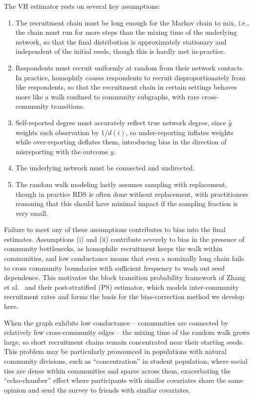 \documentclass[11pt,a4paper,twocolumn,twoside]{rho-class/rho}
\begin{document}
The VH estimator rests on several key assumptions: 
\begin{enumerate}[label=\roman*)]
    \item The recruitment chain must be long enough for the Markov chain to mix, i.e., the chain must run for more steps than the mixing time of the underlying network, so that the final distribution is approximately stationary and independent of the initial seeds, though this is hardly met in-practice.
    \item Respondents must recruit uniformly at random from their network contacts. In practice, homophily causes respondents to recruit disproportionately from like respondents, so that the recruitment chain in certain settings behaves more like a walk confined to community subgraphs, with rare cross-community transitions.
    \item Self-reported degree must accurately reflect true network degree, since $\hat{y}$ weights each observation by $1/d(i)$, so under-reporting inflates weights while over-reporting deflates them, introducing bias in the direction of misreporting with the outcome $y$.
    \item The underlying network must be connected and undirected.
    \item The random walk modeling lastly assumes sampling with replacement, though in practice RDS is often done without replacement, with practitioners reasoning that this should have minimal impact if the sampling fraction is very small.
\end{enumerate}

Failure to meet any of these assumptions contributes to bias into the final estimates. Assumptions (i) and (ii) contribute severely to bias in the presence of community bottlenecks, as homophilic recruitment keeps the walk within communities, and low conductance means that even a nominally long chain fails to cross community boundaries with sufficient frequency to wash out seed dependence. This motivates the block transition probability framework of Zhang et al.~\cite{zhang2018post} and their post-stratified (PS) estimator, which models inter-community recruitment rates and forms the basis for the bias-correction method we develop here.

When the graph exhibits low conductance -- communities are connected by relatively few cross-community edges -- the mixing time of the random walk grows large, so short recruitment chains remain concentrated near their starting seeds. This problem may be particularly pronounced in populations with natural community divisions, such as ``concentration'' in student population, where social ties are dense within communities and sparse across them, exacerbating the ``echo-chamber'' effect where participants with similar covariates share the same opinion and send the survey to friends with similar covariates.
\end{document}
